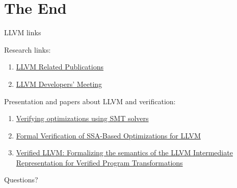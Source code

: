 \documentclass[8pt]{beamer}
\begin{document}
\section*{The End}

\begin{frame}[fragile]{LLVM links}
  \begin{block}{Research links:}
    \begin{enumerate}
      \item \href{http://llvm.org/pubs/}{LLVM Related Publications}
      \item \href{http://llvm.org/devmtg/}{LLVM Developers' Meeting}
    \end{enumerate}
  \end{block}

  \begin{block}{Presentation and papers about LLVM and verification:}
    \begin{enumerate}
      \item \href{http://llvm.org/devmtg/2013-11/#talk5}
         {Verifying optimizations using SMT solvers}
      \item \href{http://www.cs.rutgers.edu/~santosh.nagarakatte/pldi2013.pdf}
        {Formal Verification of SSA-Based Optimizations for LLVM}
      \item \href{http://llvm.org/devmtg/2012-11/#talk5}
        {Verified LLVM: Formalizing the semantics of the LLVM Intermediate
          Representation for Verified Program Transformations}
    \end{enumerate}
  \end{block}
\end{frame}

\begin{frame}{}
  \begin{center}
    {\Huge Questions?}
  \end{center}
\end{frame}
\end{document}

